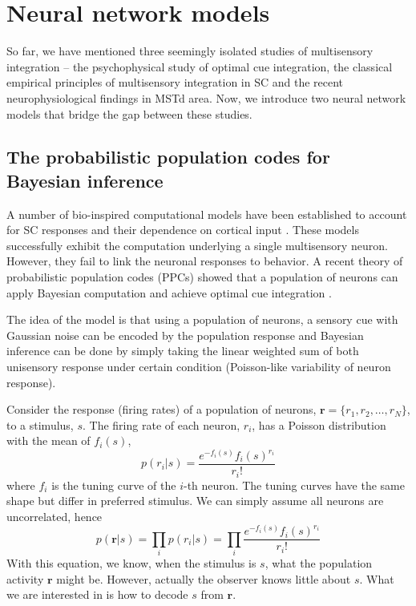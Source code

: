 \documentclass{article}[11pt]
\begin{document}
\section{Neural network models}
So far, we have mentioned three seemingly isolated studies of multisensory integration -- the psychophysical study of optimal cue integration, the classical empirical principles of multisensory integration in SC and the recent neurophysiological findings in MSTd area. Now, we introduce two neural network models that bridge the gap between these studies.

\subsection{The probabilistic population codes for Bayesian inference}
A number of bio-inspired computational models have been established to account for SC responses and their dependence on cortical input \cite{patton_modeling_2003, alvarado_neural_2008}. These models successfully exhibit the computation underlying a single multisensory neuron. However, they fail to link the neuronal responses to behavior. A recent theory of probabilistic population codes (PPCs) showed that a population of neurons can apply Bayesian computation and achieve optimal cue integration \cite{ma_bayesian_2006}.

The idea of the model is that using a population of neurons, a sensory cue with Gaussian noise can be encoded by the population response and Bayesian inference can be done by simply taking the linear weighted sum of both unisensory response under certain condition (Poisson-like variability of neuron response).

Consider the response (firing rates) of a population of neurons, $\mathbf{r} = \{ r_1, r_2, \dots, r_N \}$, to a stimulus, $s$. The firing rate of each neuron, $r_i$, has a Poisson distribution with the mean of $f_i(s)$, 
\begin{equation}
  p(r_i|s) = \frac{e^{-f_i(s)} f_i(s)^{r_i}}{r_i!}
  \label{eq:poisson}
\end{equation}
where $f_i$ is the tuning curve of the $i$-th neuron. The tuning curves have the same shape but differ in preferred stimulus. We can simply assume all neurons are uncorrelated, hence
\begin{equation}
  p(\mathbf{r}|s) = \prod_{i} p(r_i|s) = \prod_{i} \frac{e^{-f_i(s)} f_i(s)^{r_i}}{r_i!}
  \label{eq:popvar}
\end{equation}
With this equation, we know, when the stimulus is $s$, what the population activity $\mathbf{r}$ might be. However, actually the observer knows little about $s$. What we are interested in is how to decode $s$ from $\mathbf{r}$.
\end{document}
